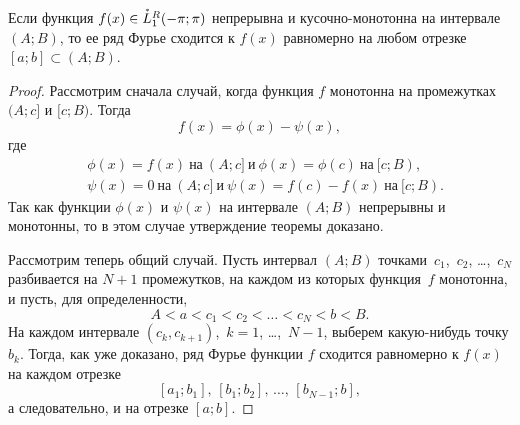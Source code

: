 \begin{thm}  \label{ch18thm4}
Если функция $f(x) \in \accentset{*}{L}^{R}_1(-\pi;\pi)$ непрерывна и кусочно-монотонна на интервале $(A;B)$, то ее ряд Фурье сходится к $f(x)$ равномерно на любом отрезке $[a;b] \subset (A;B)$.
\end{thm}
\begin{proof}
Рассмотрим сначала случай, когда функция $f$ монотонна на промежутках $(A;c]$ и $[c;B)$. Тогда
$$
f(x) = \phi(x) - \psi(x),
$$
где
\begin{align*}
&\phi(x) = f(x)\ \text{на}\ (A;c]\ \text{и}\ \phi(x) = \phi(c)\ \text{на}\ [c;B),\\
&\psi(x) = 0   \ \text{на}\ (A;c]\ \text{и}\ \psi(x) = f(c) - f(x) \ \text{на}\ [c;B).
\end{align*}
Так как функции $\phi(x)$ и $\psi(x)$ на интервале $(A;B)$ непрерывны и монотонны, то в этом случае утверждение теоремы доказано.

Рассмотрим теперь общий случай. Пусть интервал $(A;B)$ точками~$c_1$,~$c_2$, \ldots,~$c_N$ разбивается на $N + 1$ промежутков, на каждом из которых функция~$f$ монотонна, и пусть, для определенности,
$$
A < a < c_1 < c_2 < \ldots < c_N < b < B.
$$
На каждом интервале $(c_k, c_{k+1})$,~$k = 1$, \ldots,~$N - 1$, выберем какую-нибудь точку $b_k$. Тогда, как уже доказано, ряд Фурье функции $f$ сходится равномерно к $f(x)$ на каждом отрезке
$$
[a_1; b_1],\,[b_1; b_2],\,\ldots,\, [b_{N-1};b],
$$
а следовательно, и на отрезке $[a;b]$.
\end{proof}